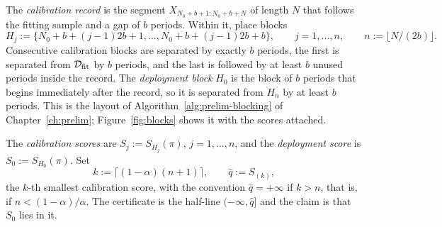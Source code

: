 \documentclass[../../../main.tex]{subfiles}
\begin{document}
The \emph{calibration record} is the segment $X_{N_0+b+1:N_0+b+N}$ of length $N$ that follows the fitting sample and a gap of $b$ periods. Within it, place blocks
\[
H_j:=\{N_0+b+(j-1)2b+1,\dots,N_0+b+(j-1)2b+b\},\qquad j=1,\dots,n,\qquad n:=\lfloor N/(2b)\rfloor .
\]
Consecutive calibration blocks are separated by exactly $b$ periods, the first is separated from $\mathcal D_{\mathrm{fit}}$ by $b$ periods, and the last is followed by at least $b$ unused periods inside the record. The \emph{deployment block} $H_0$ is the block of $b$ periods that begins immediately after the record, so it is separated from $H_n$ by at least $b$ periods. This is the layout of Algorithm~\ref{alg:prelim-blocking} of Chapter~\ref{ch:prelim}; Figure~\ref{fig:blocks} shows it with the scores attached.


The \emph{calibration scores} are $S_j:=S_{H_j}(\pi)$, $j=1,\dots,n$, and the \emph{deployment score} is $S_0:=S_{H_0}(\pi)$. Set
\[
k:=\lceil(1-\alpha)(n+1)\rceil,\qquad \hat q:=S_{(k)},
\]
the $k$-th smallest calibration score, with the convention $\hat q=+\infty$ if $k>n$, that is, if $n<(1-\alpha)/\alpha$. The certificate is the half-line $(-\infty,\hat q]$ and the claim is that $S_0$ lies in it.
\end{document}
